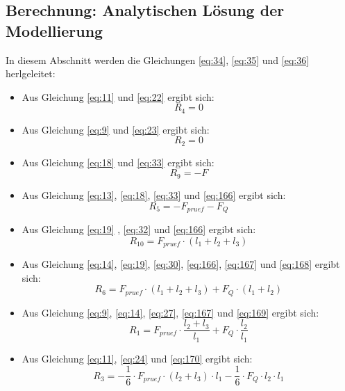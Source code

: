 \subsection{Berechnung: Analytischen Lösung der Modellierung}\label{Lösung}
In diesem Abschnitt werden die Gleichungen \ref{eq:34}, \ref{eq:35} und \ref{eq:36} herlgeleitet:
\begin{itemize}
	\item Aus Gleichung \ref{eq:11} und \ref{eq:22} ergibt sich:
	\begin{equation}\label{eq:164}
		R_{4}=0
	\end{equation}
	\item Aus Gleichung \ref{eq:9} und \ref{eq:23} ergibt sich:
	\begin{equation}\label{eq:165}
		R_{2}=0
	\end{equation}
	\item Aus Gleichung \ref{eq:18} und \ref{eq:33} ergibt sich:
	\begin{equation}\label{eq:166}
		R_{9}=-F
	\end{equation}
	\item Aus Gleichung \ref{eq:13}, \ref{eq:18}, \ref{eq:33} und \ref{eq:166} ergibt sich:
	\begin{equation}\label{eq:167}
		R_{5}=-F_{pruef}-F_{Q}
	\end{equation}
	\item Aus Gleichung \ref{eq:19} , \ref{eq:32} und \ref{eq:166} ergibt sich:
	\begin{equation}\label{eq:168}
		R_{10}=F_{pruef}\cdot (l_{1}+l_{2}+l_{3})
	\end{equation}
	\item Aus Gleichung \ref{eq:14}, \ref{eq:19}, \ref{eq:30}, \ref{eq:166}, \ref{eq:167} und \ref{eq:168} ergibt sich:
	\begin{equation}\label{eq:169}
		R_{6}=F_{pruef}\cdot (l_{1}+l_{2}+l_{3}) + F_{Q}\cdot (l_{1}+l_{2})
	\end{equation}
	\item Aus Gleichung \ref{eq:9}, \ref{eq:14}, \ref{eq:27}, \ref{eq:167} und \ref{eq:169} ergibt sich:
	\begin{equation}\label{eq:170}
		R_{1}=F_{pruef}\cdot\frac{l_{2}+l_{3}}{l_{1}} + F_{Q}\cdot\frac{l_{2}}{l_{1}}
	\end{equation}
	\item Aus Gleichung \ref{eq:11}, \ref{eq:24} und \ref{eq:170} ergibt sich:
	\begin{equation}\label{eq:171}
		R_{3}=-\frac{1}{6}\cdot F_{pruef}\cdot (l_{2}+l_{3})\cdot l_{1} - \frac{1}{6}\cdot F_{Q}\cdot l_{2}\cdot l_{1}

\end{equation}
\end{itemize}
